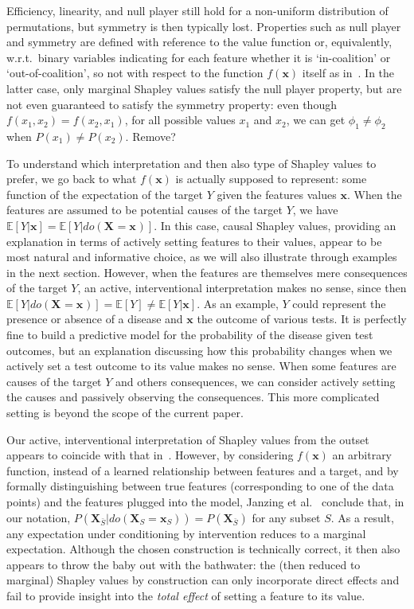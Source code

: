 \documentclass{article}
\newcommand{\vX}{\mathbf{X}}
\newcommand{\vx}{\mathbf{x}}
\newcommand{\expectation}{\mathbb{E}}
\newcommand{\dodo}{\mathit{do}}
\newcommand{\lvdo}[1]{\dodo(\vX_{#1} = \vx_{#1})}
\newcommand{\comment}[1]{{\color{red} #1}}
\begin{document}
Efficiency, linearity, and null player still hold for a non-uniform distribution of permutations, but symmetry is then typically lost. Properties such as null player and symmetry are defined with reference to the value function or, equivalently, w.r.t.\ binary variables indicating for each feature whether it is `in-coalition' or `out-of-coalition', so not with respect to the function $f(\vx)$ itself as in~\cite{sundararajan2019many}. In the latter case, only marginal Shapley values satisfy the null player property, but are not even guaranteed to satisfy the symmetry property: even though $f(x_1,x_2) = f(x_2,x_1)$, for all possible values $x_1$ and $x_2$, we can get $\phi_1 \neq \phi_2$ when $P(x_1) \neq P(x_2)$. \comment{Remove?}

To understand which interpretation and then also type of Shapley values to prefer, we go back to what $f(\vx)$ is actually supposed to represent: some function of the expectation of the target $Y$ given the features values $\vx$. When the features are assumed to be potential causes of the target $Y$, we have $\expectation[Y|\vx] = \expectation[Y|\lvdo{}]$. In this case, causal Shapley values, providing an explanation in terms of actively setting features to their values, appear to be most natural and informative choice, as we will also illustrate through examples in the next section. However, when the features are themselves mere consequences of the target $Y$, an active, interventional interpretation makes no sense, since then $\expectation[Y|\lvdo{}] = \expectation[Y] \neq \expectation[Y|\vx]$. As an example, $Y$ could represent the presence or absence of a disease and $\vx$ the outcome of various tests. It is perfectly fine to build a predictive model for the probability of the disease given test outcomes, but an explanation discussing how this probability changes when we actively set a test outcome to its value makes no sense. When some features are causes of the target $Y$ and others consequences, we can consider actively setting the causes and passively observing the consequences. This more complicated setting is beyond the scope of the current paper.

Our active, interventional interpretation of Shapley values from the outset appears to coincide with that in~\cite{janzing2019feature,lundberg2020local}. However, by considering $f(\vx)$ an arbitrary function, instead of a learned relationship between features and a target, and by formally distinguishing between true features (corresponding to one of the data points) and the features plugged into the model, Janzing et al.~\cite{janzing2019feature} conclude that, in our notation, $P(\vX_{\bar{S}}|\lvdo{S}) = P(\vX_{\bar{S}})$ for any subset $S$. As a result, any expectation under conditioning by intervention reduces to a marginal expectation. Although the chosen construction is technically correct, it then also appears to throw the baby out with the bathwater: the (then reduced to marginal) Shapley values by construction can only incorporate direct effects and fail to provide insight into the {\em total effect} of setting a feature to its value.
\end{document}
